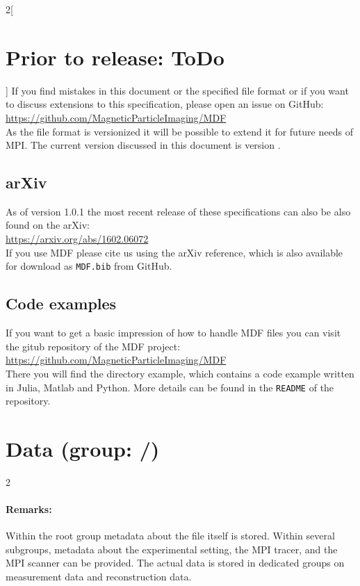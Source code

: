 \documentclass[landscape,a4paper]{article} %
\newcommand{\inlvar}[1]{{\ttfamily#1}}
\begin{document}
\begin{multicols}{2}[\section{Prior to release: ToDo}]
If you find mistakes in this document or the specified file format or if you want to discuss extensions to this specification, please open an issue on GitHub:\\
\hspace*{1cm}\url{https://github.com/MagneticParticleImaging/MDF}\\
As the file format is versionized it will be possible to extend it for future needs of MPI. The current version discussed in this document is version \version.

\subsection{arXiv}
As of version 1.0.1 the most recent release of these specifications can also be also found on the arXiv:\\
\hspace*{1cm}\url{https://arxiv.org/abs/1602.06072}\\
If you use MDF please cite us using the arXiv reference, which is also available for download as \texttt{MDF.bib} from GitHub.


\subsection{Code examples}		 
  		  
If you want to get a basic impression of how to handle MDF files you can visit the gitub repository of the MDF project:\\		
  \hspace*{1cm}\url{https://github.com/MagneticParticleImaging/MDF}\\	
There you will find the directory example, which contains a code example written in Julia, Matlab and Python. More details can be found in the \texttt{README} of the repository.
 
\end{multicols}


\section{Data (group: \inlvar{/})}
 \setlength\extrarowheight{5pt}

\begin{multicols}{2}
\paragraph{Remarks:} Within the root group metadata about the file itself is stored. Within several subgroups, metadata about the experimental setting, the MPI tracer, and the MPI scanner can be provided. The actual data is stored in dedicated groups on measurement data and reconstruction data.
\end{multicols}
\end{document}
